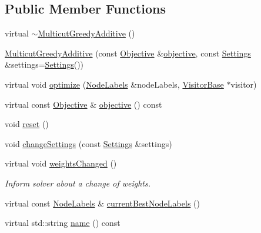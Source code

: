 \subsection*{Public Member Functions}
\begin{DoxyCompactItemize}
\item 
virtual \hyperlink{classnifty_1_1graph_1_1MulticutGreedyAdditive_ac115aa387bcdd48f2583fed59919cf56}{$\sim$\+Multicut\+Greedy\+Additive} ()
\item 
\hyperlink{classnifty_1_1graph_1_1MulticutGreedyAdditive_a00752c96b890758fafd2dfab77153f64}{Multicut\+Greedy\+Additive} (const \hyperlink{classnifty_1_1graph_1_1MulticutGreedyAdditive_a46ff3cae81673292ace3d4d4dd6f3011}{Objective} \&\hyperlink{classnifty_1_1graph_1_1MulticutGreedyAdditive_a4393be74fba191852f4d207720a107f0}{objective}, const \hyperlink{classnifty_1_1graph_1_1MulticutGreedyAdditive_ab14192647e24d574c75538087acfd090}{Settings} \&settings=\hyperlink{classnifty_1_1graph_1_1MulticutGreedyAdditive_ab14192647e24d574c75538087acfd090}{Settings}())
\item 
virtual void \hyperlink{classnifty_1_1graph_1_1MulticutGreedyAdditive_a98a800d164c6445dad860f3029f0b102}{optimize} (\hyperlink{classnifty_1_1graph_1_1MulticutGreedyAdditive_a7e666246f7000022acfb2dd91474afed}{Node\+Labels} \&node\+Labels, \hyperlink{classnifty_1_1graph_1_1MulticutBase_a5882fb69df59d8113f6a81a0dac26eaa}{Visitor\+Base} $\ast$visitor)
\item 
virtual const \hyperlink{classnifty_1_1graph_1_1MulticutGreedyAdditive_a46ff3cae81673292ace3d4d4dd6f3011}{Objective} \& \hyperlink{classnifty_1_1graph_1_1MulticutGreedyAdditive_a4393be74fba191852f4d207720a107f0}{objective} () const 
\item 
void \hyperlink{classnifty_1_1graph_1_1MulticutGreedyAdditive_a0442e7912b8bc1a12b42ad722f857b2c}{reset} ()
\item 
void \hyperlink{classnifty_1_1graph_1_1MulticutGreedyAdditive_a65629e4b48ea237e8dfb2f497b3f3e22}{change\+Settings} (const \hyperlink{classnifty_1_1graph_1_1MulticutGreedyAdditive_ab14192647e24d574c75538087acfd090}{Settings} \&settings)
\item 
virtual void \hyperlink{classnifty_1_1graph_1_1MulticutGreedyAdditive_a1a43c27265bf535e9e8d638d1d64531d}{weights\+Changed} ()
\begin{DoxyCompactList}\small\item\em Inform solver about a change of weights. \end{DoxyCompactList}\item 
virtual const \hyperlink{classnifty_1_1graph_1_1MulticutGreedyAdditive_a7e666246f7000022acfb2dd91474afed}{Node\+Labels} \& \hyperlink{classnifty_1_1graph_1_1MulticutGreedyAdditive_af343dd2b9893bd66f0e6aeccb52714bd}{current\+Best\+Node\+Labels} ()
\item 
virtual std\+::string \hyperlink{classnifty_1_1graph_1_1MulticutGreedyAdditive_a3cb332628afbf568988d0ec2fee6f797}{name} () const 
\end{DoxyCompactItemize}


